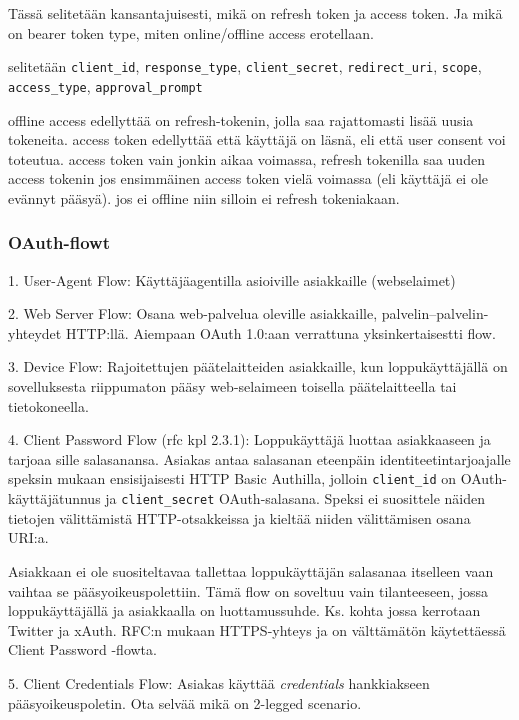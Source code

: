 \documentclass[finnish,gradu]{tktltiki}
\begin{document}
  Tässä selitetään kansantajuisesti, mikä on refresh token ja access token.
  Ja mikä on bearer token type, miten online/offline access erotellaan.

  selitetään \verb!client_id!, \verb!response_type!, \verb!client_secret!, \verb!redirect_uri!, \verb!scope!, \verb!access_type!, \verb!approval_prompt!

  offline access edellyttää on refresh-tokenin, jolla saa rajattomasti lisää uusia tokeneita. access token edellyttää että käyttäjä on läsnä, eli että user consent voi toteutua. access token vain jonkin aikaa voimassa, refresh tokenilla saa uuden access tokenin jos ensimmäinen access token vielä voimassa (eli käyttäjä ei ole evännyt pääsyä). jos ei offline niin silloin ei refresh tokeniakaan.



  \subsubsection{OAuth-flowt} %
  \label{ssub:oauth_flowt}

  1. User-Agent Flow: Käyttäjäagentilla asioiville asiakkaille (webselaimet)

  2. Web Server Flow: Osana web-palvelua oleville asiakkaille, palvelin--palvelin-yhteydet HTTP:llä. Aiempaan OAuth 1.0:aan verrattuna yksinkertaisestti flow.

  3. Device Flow: Rajoitettujen päätelaitteiden asiakkaille, kun loppukäyttäjällä on sovelluksesta riippumaton pääsy web-selaimeen toisella päätelaitteella tai tietokoneella.

  4. Client Password Flow (rfc kpl 2.3.1): Loppukäyttäjä luottaa asiakkaaseen ja tarjoaa sille salasanansa. Asiakas antaa salasanan eteenpäin identiteetintarjoajalle speksin mukaan ensisijaisesti HTTP Basic Authilla, jolloin \verb!client_id! on OAuth-käyttäjätunnus ja \verb!client_secret! OAuth-salasana. Speksi ei suosittele näiden tietojen välittämistä HTTP-otsakkeissa ja kieltää niiden välittämisen osana URI:a.

  Asiakkaan ei ole suositeltavaa tallettaa loppukäyttäjän salasanaa itselleen vaan vaihtaa se pääsyoikeuspolettiin. Tämä flow on soveltuu vain tilanteeseen, jossa loppukäyttäjällä ja asiakkaalla on luottamussuhde. Ks. kohta jossa kerrotaan Twitter ja xAuth. RFC:n mukaan HTTPS-yhteys ja on välttämätön käytettäessä Client Password -flowta.

  5. Client Credentials Flow: Asiakas käyttää \emph{credentials} hankkiakseen pääsyoikeuspoletin. Ota selvää mikä on 2-legged scenario.
\end{document}
